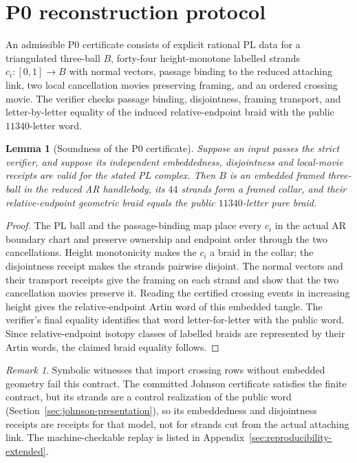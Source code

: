 \documentclass[11pt]{amsart}
\newtheorem{lemma}[theorem]{Lemma}
\theoremstyle{definition}
\theoremstyle{remark}
\newtheorem{remark}[theorem]{Remark}
\begin{document}
\appendix



\section{P0 reconstruction protocol}\label{app:p0-reconstruction}

An admissible P0 certificate consists of explicit rational PL data for a
triangulated three-ball $B$, forty-four height-monotone labelled strands
$c_i:[0,1]\to B$ with normal vectors, passage binding to the reduced
attaching link, two local cancellation movies preserving framing, and an
ordered crossing movie.  The verifier checks passage binding, disjointness,
framing transport, and letter-by-letter equality of the induced
relative-endpoint braid with the public $11340$-letter word.

\begin{lemma}[Soundness of the P0 certificate]
Suppose an input passes the strict verifier, and suppose its independent
embeddedness, disjointness and local-movie receipts are valid for the stated
PL complex.  Then $B$ is an embedded framed three-ball in the reduced AR
handlebody, its $44$ strands form a framed collar, and their relative-endpoint
geometric braid equals the public $11340$-letter pure braid.
\end{lemma}

\begin{proof}
The PL ball and the passage-binding map place every $c_i$ in the actual AR
boundary chart and preserve ownership and endpoint order through the two
cancellations.  Height monotonicity makes the $c_i$ a braid in the collar;
the disjointness receipt makes the strands pairwise disjoint.  The normal
vectors and their transport receipts give the framing on each strand and
show that the two cancellation movies preserve it.  Reading the certified
crossing events in increasing height gives the relative-endpoint Artin word
of this embedded tangle.  The verifier's final equality identifies that word
letter-for-letter with the public word.  Since relative-endpoint isotopy
classes of labelled braids are represented by their Artin words, the claimed
braid equality follows.
\end{proof}

\begin{remark}
Symbolic witnesses that import crossing rows without embedded geometry fail
this contract.  The committed Johnson certificate satisfies the finite
contract, but its strands are a control realization of the public word
(Section~\ref{sec:johnson-presentation}), so its embeddedness and
disjointness receipts are receipts for that model, not for strands cut from
the actual attaching link.  The machine-checkable replay is listed in
Appendix~\ref{sec:reproducibility-extended}.
\end{remark}
\end{document}
